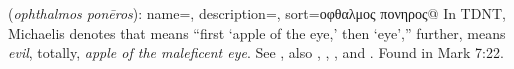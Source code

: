 \item[Maleficent eye,]

(\textit{ophthalmos ponēros}):
{
    name=,
    description={},
    sort=οφθαλμος πονηρος@
}
In TDNT, Michaelis denotes that  means ``first `apple of the eye,' then `eye','' 
 further,  means \emph{evil}, totally, \emph{apple of the maleficent eye}. See , also , , , and .
Found in Mark 7:22.
